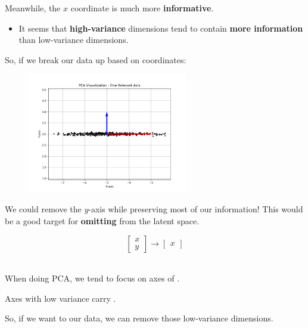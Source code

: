             Meanwhile, the $x$ coordinate is much more \textbf{informative}.

            \begin{itemize}
                \item It seems that \textbf{high-variance} dimensions tend to contain \textbf{more information} than low-variance dimensions.
            \end{itemize}

            So, if we break our data up based on coordinates:

            \begin{figure}[H]
                \centering
                \includegraphics[width=70mm,scale=0.5]{images/autoencoder_images/pca_x_axis_vec.png}
            \end{figure}

            We could remove the $y$-axis while preserving most of our information! This would be a good target for \textbf{omitting} from the latent space.
            
            \begin{equation}
                \begin{bmatrix}
                    x \\ y
                \end{bmatrix}
                \longrightarrow
                \begin{bmatrix}
                    x
                \end{bmatrix}
            \end{equation}\\

            \begin{concept}
                When doing PCA, we tend to focus on axes of .

                Axes with low variance carry .

                So, if we want to  our data, we can remove those low-variance dimensions.
            \end{concept}

